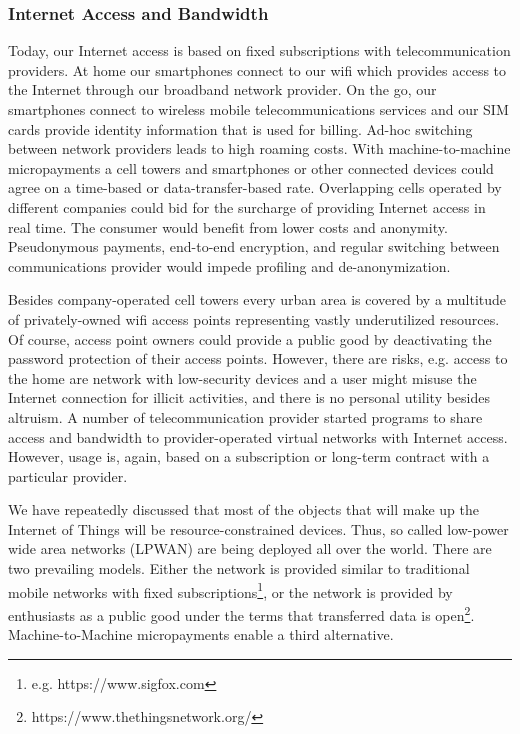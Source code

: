 \subsubsection{Internet Access and Bandwidth}

Today, our Internet access is based on fixed subscriptions with telecommunication providers. At home our smartphones connect to our wifi which provides access to the Internet through our broadband network provider. On the go, our smartphones connect to wireless mobile telecommunications services and our SIM cards provide identity information that is used for billing. Ad-hoc switching between network providers leads to high roaming costs. With machine-to-machine micropayments a cell towers and smartphones or other connected devices could agree on a time-based or data-transfer-based rate. Overlapping cells operated by different companies could bid for the surcharge of providing Internet access in real time. The consumer would benefit from lower costs and anonymity. Pseudonymous payments, end-to-end encryption, and regular switching between communications provider would impede profiling and de-anonymization.

Besides company-operated cell towers every urban area is covered by a multitude of privately-owned wifi access points representing vastly underutilized resources. Of course, access point owners could provide a public good by deactivating the password protection of their access points. However, there are risks, e.g. access to the home are network with low-security devices and a user might misuse the Internet connection for illicit activities, and there is no personal utility besides altruism. A number of telecommunication provider started programs to share access and bandwidth to provider-operated virtual networks with Internet access. However, usage is, again, based on a subscription or long-term contract with a particular provider.

We have repeatedly discussed that most of the objects that will make up the Internet of Things will be resource-constrained devices. Thus, so called low-power wide area networks (LPWAN) are being deployed all over the world. There are two prevailing models. Either the network is provided similar to traditional mobile networks with fixed subscriptions\footnote{e.g. https://www.sigfox.com}, or the network is provided by enthusiasts as a public good under the terms that transferred data is open\footnote{https://www.thethingsnetwork.org/}.
Machine-to-Machine micropayments enable a third alternative.

